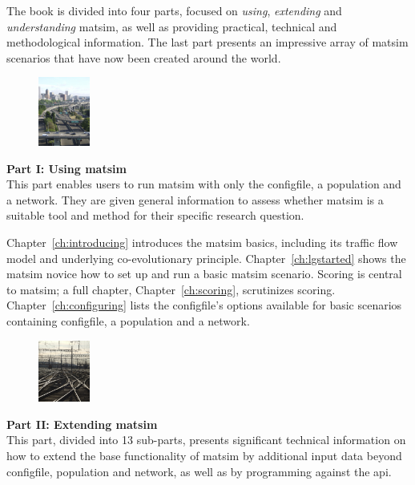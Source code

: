 The book is divided into four parts, focused on \emph{using}, \emph{extending} and \emph{understanding} \gls{matsim}, as well as providing practical, technical and methodological information. The last part presents an impressive array of  \gls{matsim} scenarios that have now been created around the world. %

\clearpage
\begin{figure}
\vspace{-5pt}
  \begin{center}
    \includegraphics[width=0.15\textwidth]{images/DSCF2906.jpg}
  \end{center}
\end{figure}
\textbf{Part I: Using \acrshort{matsim}}\\
This part enables users to run \gls{matsim} with only the \gls{configfile}, a population and a network. They are given general information to assess whether \gls{matsim} is a suitable tool and method for their specific research question.

Chapter~\ref{ch:introducing} introduces the \gls{matsim} basics, including its traffic flow model and underlying co-evolutionary principle. 
Chapter~\ref{ch:lgstarted} shows the \gls{matsim} novice how to set up and run a basic \gls{matsim} \gls{scenario}. 
Scoring is central to \gls{matsim}; a full chapter, Chapter~\ref{ch:scoring}, scrutinizes scoring. 
Chapter~\ref{ch:configuring} lists the \gls{configfile}'s options available for basic scenarios containing \gls{configfile}, a population and a network.  


\begin{figure}
\vspace{-10pt}
  \begin{center}
    \includegraphics[width=0.15\textwidth]{images/DSCF5871.jpg}
  \end{center}
\end{figure}
\textbf{Part II: Extending \acrshort{matsim}}\\
This part, divided into 13 sub-parts, presents significant technical information on how to extend the base functionality of \gls{matsim} by additional input data beyond \gls{configfile}, population and network, as well as by programming against the \gls{api}. 

